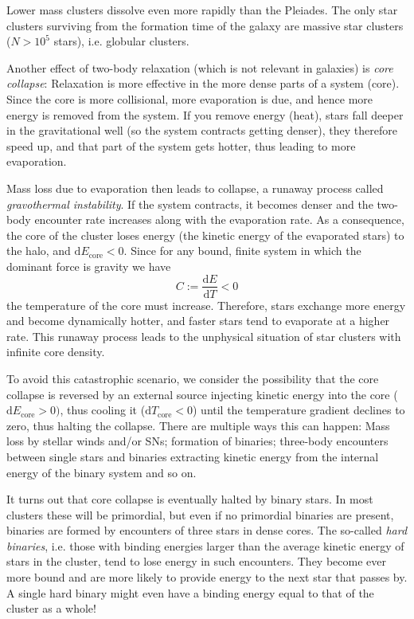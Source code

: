 \par Lower mass clusters dissolve even more rapidly than the Pleiades. The only star clusters surviving from the formation time of the galaxy are massive star clusters ($N > 10^{5}$ stars), i.e. globular clusters.
\par Another effect of two-body relaxation (which is not relevant in galaxies) is \emph{core collapse}: Relaxation is more effective in the more dense parts of a system (core). Since the core is more collisional, more evaporation is due, and hence more energy is removed from the system. If you remove energy (heat), stars fall deeper in the gravitational well (so the system contracts getting denser), they therefore speed up, and that part of the system gets hotter, thus leading to more evaporation.
\par Mass loss due to evaporation then leads to collapse, a runaway process called \emph{gravothermal instability}. If the system contracts, it becomes denser and the two-body encounter rate increases along with the evaporation rate. As a consequence, the core of the cluster loses energy (the kinetic energy of the evaporated stars) to the halo, and $\text{d}E_{\text{core}}<0$. Since for any bound, ﬁnite system in which the dominant force is gravity we have
\begin{equation*}
    C := \frac{\text{d}E}{\text{d}T} < 0
\end{equation*}
the temperature of the core must increase. Therefore, stars exchange more energy and become dynamically hotter, and faster stars tend to evaporate at a higher rate. This runaway process leads to the unphysical situation of star clusters with inﬁnite core density.
\par To avoid this catastrophic scenario, we consider the possibility that the core collapse is reversed by an external source injecting kinetic energy into the core ($\text{d}E_{\text{core}} > 0)$, thus cooling it ($\text{d}T_{\text{core}} < 0$) until the temperature gradient declines to zero, thus halting the collapse. There are multiple ways this can happen: Mass loss by stellar winds and/or SNs; formation of binaries; three-body encounters between single stars and binaries extracting kinetic energy from the internal energy of the binary system and so on.
\par It turns out that core collapse is eventually halted by binary stars. In most clusters these will be primordial, but even if no primordial binaries are present, binaries are formed by encounters of three stars in dense cores. The so-called \emph{hard binaries}, i.e. those with binding energies larger than the average kinetic energy of stars in the cluster, tend to lose energy in such encounters. They become ever more bound and are more likely to provide energy to the next star that passes by. A single hard binary might even have a binding energy equal to that of the cluster as a whole!
